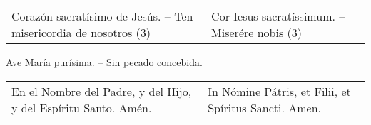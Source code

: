 \documentclass[./rosary.tex]{subfiles}
\begin{document}
\begin{longtable} { p{} p{} }
    Corazón sacratísimo de Jesús. -- Ten misericordia de nosotros (3)
        &
    Cor Iesus sacratíssimum. -- Miserére nobis (3)
\end{longtable}

\begin{center}
    Ave María purísima. -- Sin pecado concebida.
\end{center}

\begin{longtable} { p{} p{} }
    En el Nombre del Padre, y del Hijo, y del Espíritu Santo. Amén.
        &
    In Nómine Pátris, et Filii, et Spíritus Sancti. Amen.
\end{longtable}
\end{document}
